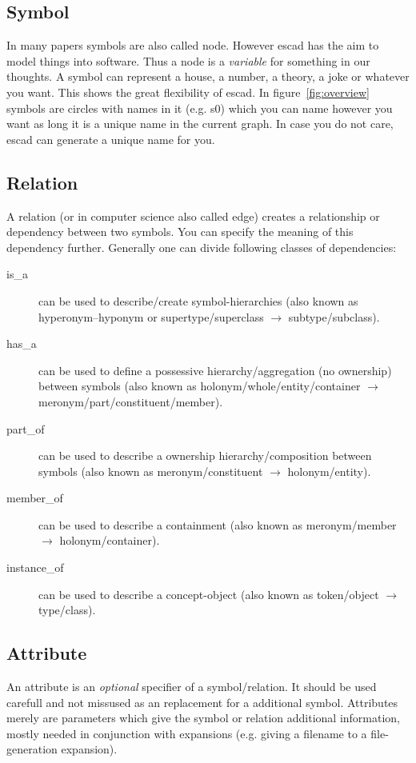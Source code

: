 \documentclass[a4paper, 12pt, openany]{scrbook}
\begin{document}
\subsection{Symbol}
In many papers symbols are also called node. However escad has the aim to model things into software. Thus a node is a \emph{variable} for something in our thoughts. A symbol can represent a house, a number, a theory, a joke or whatever you want. This shows the great flexibility of escad. In figure~\ref{fig:overview} symbols are circles with names in it (e.g. s0) which you can name however you want as long it is a unique name in the current graph. In case you do not care, escad can generate a unique name for you.
\subsection{Relation}
A relation (or in computer science also called edge) creates a relationship or dependency between two symbols. You can specify the meaning of this dependency further. Generally one can divide following classes of dependencies:
\begin{description}
\item[is\_a] can be used to describe/create symbol-hierarchies (also known as hyperonym–hyponym or supertype/superclass $\rightarrow$ subtype/subclass).
\item[has\_a] can be used to define a possessive hierarchy/aggregation (no ownership) between symbols (also known as holonym/whole/entity/container $\rightarrow$ meronym/part/constituent/member).
\item[part\_of] can be used to describe a ownership hierarchy/composition between symbols (also known as meronym/constituent $\rightarrow$ holonym/entity).
\item[member\_of] can be used to describe a containment (also known as meronym/member $\rightarrow$ holonym/container).
\item[instance\_of] can be used to describe a concept-object (also known as token/object $\rightarrow$ type/class).
\end{description}
\subsection{Attribute}
An attribute is an \emph{optional} specifier of a symbol/relation. It should be used carefull and not missused as an replacement for a additional symbol. Attributes merely are parameters which give the symbol or relation additional information, mostly needed in conjunction with expansions (e.g. giving a filename to a file-generation expansion).
\end{document}
